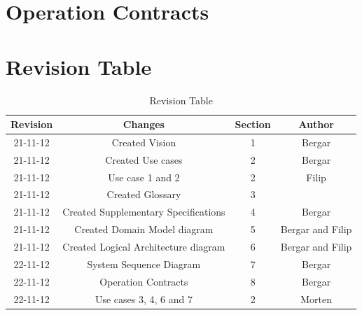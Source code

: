 \documentclass[11pt,a4paper]{article}
\begin{document}
\section{Operation Contracts}


\section{Revision Table}
\begin{table}[h]
\caption{Revision Table}
\begin{center}
\begin{tabular}{c|c|c|c}
\hline 
Revision & Changes & Section & Author \\ \hline 
21-11-12 & Created Vision & 1 & Bergar \\ 
21-11-12 & Created Use cases & 2 & Bergar \\
21-11-12 & Use case 1 and 2 & 2 & Filip \\
21-11-12 & Created Glossary & 3 & \\
21-11-12 & Created Supplementary Specifications & 4 & Bergar \\ 
21-11-12 & Created Domain Model diagram & 5 & Bergar and Filip \\
21-11-12 & Created Logical Architecture diagram & 6 & Bergar and Filip \\
\hline 
22-11-12 & System Sequence Diagram & 7 & Bergar \\
22-11-12 & Operation Contracts & 8 & Bergar \\
22-11-12 & Use cases 3, 4, 6 and 7 & 2 & Morten \\
\hline
\end{tabular} 
\end{center}
\end{table}
	
\end{document}
